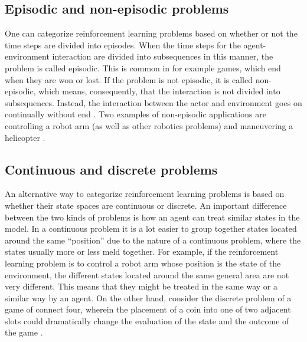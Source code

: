 \subsection{Episodic and non-episodic problems}
One can categorize reinforcement learning problems based on whether or not the time steps are divided into episodes. When the time steps for the agent-environment interaction are divided into subsequences in this manner, the problem is called episodic. This is common in for example games, which end when they are won or lost. If the problem is not episodic, it is called non-episodic, which means, consequently, that the interaction is not divided into subsequences. Instead, the interaction between the actor and environment goes on continually without end \parencite{barto1998reinforcement}. Two examples of non-episodic applications are controlling a robot arm (as well as other robotics problems) and maneuvering a helicopter \parencite{ng2006autonomous}. 

\subsection{Continuous and discrete problems}
An alternative way to categorize reinforcement learning problems is based on whether their state spaces are continuous or discrete. An important difference between the two kinds of problems is how an agent can treat similar states in the model. In a continuous problem it is a lot easier to group together states located around the same ``position'' due to the nature of a continuous problem, where the states usually more or less meld together. For example, if the reinforcement learning problem is to control a robot arm whose position is the state of the environment, the different states located around the same general area are not very different. This means that they might be treated in the same way or a similar way by an agent. On the other hand, consider the discrete problem of a game of connect four, wherein the placement of a coin into one of two adjacent slots could dramatically change the evaluation of the state and the outcome of the game \parencite{barto1998reinforcement}.